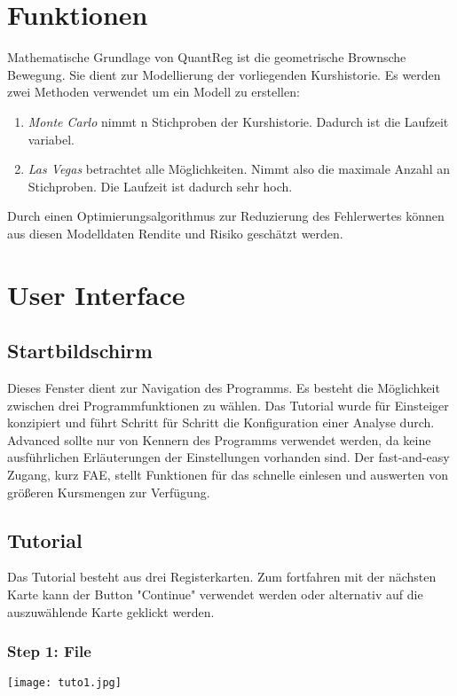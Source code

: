 \documentclass{scrartcl}
\begin{document}
\section{Funktionen}
Mathematische Grundlage von QuantReg ist die geometrische Brownsche Bewegung. Sie dient zur Modellierung der vorliegenden Kurshistorie. Es werden zwei Methoden verwendet um ein Modell zu erstellen:
\begin{enumerate}
\item{\textit{Monte Carlo} nimmt n Stichproben der Kurshistorie. Dadurch ist die Laufzeit variabel.}
\item{\textit{Las Vegas} betrachtet alle Möglichkeiten. Nimmt also die maximale Anzahl an Stichproben. Die Laufzeit ist dadurch sehr hoch.}
\end{enumerate}
Durch einen Optimierungsalgorithmus zur Reduzierung des Fehlerwertes können aus diesen Modelldaten Rendite und Risiko geschätzt werden. 

\section{User Interface}
\subsection{Startbildschirm}
Dieses Fenster dient zur Navigation des Programms. Es besteht die Möglichkeit zwischen drei Programmfunktionen zu wählen. Das Tutorial wurde für Einsteiger konzipiert und führt Schritt für Schritt die Konfiguration einer Analyse durch. Advanced sollte nur von Kennern des Programms verwendet werden, da keine ausführlichen Erläuterungen der Einstellungen vorhanden sind. Der fast-and-easy Zugang, kurz FAE, stellt Funktionen für das schnelle einlesen und auswerten von größeren Kursmengen zur Verfügung.

\subsection{Tutorial}
Das Tutorial besteht aus drei Registerkarten. Zum fortfahren mit der nächsten Karte kann der Button "Continue" verwendet werden oder alternativ auf die auszuwählende Karte geklickt werden.

\subsubsection*{Step 1: File}

\begin{center}
\texttt{[image: tuto1.jpg]}
\end{center}
\end{document}

